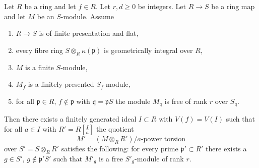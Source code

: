 \begin{lemma}
\label{lemma-helper-blowup-affine-space}
Let $R$ be a ring and let $f \in R$. Let $r, d \geq 0$ be integers.
Let $R \to S$ be a ring map and let $M$ be an $S$-module. Assume
\begin{enumerate}
\item $R \to S$ is of finite presentation and flat,
\item every fibre ring $S \otimes_R \kappa(\mathfrak p)$ is
geometrically integral over $R$,
\item $M$ is a finite $S$-module,
\item $M_f$ is a finitely presented $S_f$-module,
\item for all $\mathfrak p \in R$, $f \not \in \mathfrak p$ with
$\mathfrak q = \mathfrak pS$ the module $M_{\mathfrak q}$ is free
of rank $r$ over $S_\mathfrak q$.
\end{enumerate}
Then there exists a finitely generated ideal $I \subset R$ with
$V(f) = V(I)$ such that for all $a \in I$ with $R' = R[\frac{I}{a}]$
the quotient
$$
M' = (M \otimes_R R')/a\text{-power torsion}
$$
over $S' = S \otimes_R R'$ satisfies the following: for every prime
$\mathfrak p' \subset R'$ there exists a $g \in S'$,
$g \not \in \mathfrak p'S'$ such that $M'_g$ is a free $S'_g$-module
of rank $r$.
\end{lemma}

